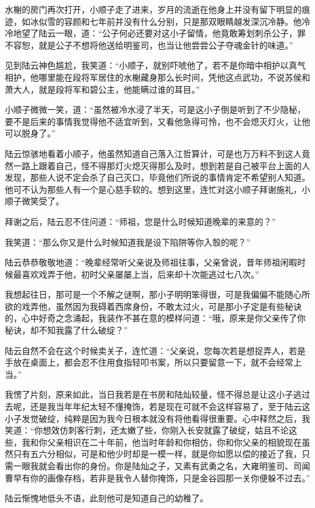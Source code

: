水榭的房门再次打开，小顺子走了进来，岁月的流逝在他身上并没有留下明显的痕迹，如冰似雪的容颜和七年前并没有什么分别，只是那双眼睛越发深沉冷静。他冷冷地望了陆云一眼，道：“公子何必还要对这小子留情，他竟敢筹划刺杀公子，罪不容恕，就是公子不想将他送给明鉴司，也当让他尝尝公子夺魂金针的味道。”

见到陆云神色尴尬，我笑道：“小顺子，就别吓唬他了，若不是你暗中相护以真气相护，他哪里能在段将军居住的水榭藏身那么长时间，凭他这点武功，不说苏侯和萧大人，就是段将军和碧公主，他能瞒过谁的耳目。”

小顺子微微一笑，道：“虽然被冷水浸了半天，可是这小子倒是听到了不少隐秘，要不是后来的事情我觉得他不适宜听到，又看他急得可怜，也不会熄灭灯火，让他可以脱身了。”

陆云惊骇地看着小顺子，他虽然知道自己落入江哲算计，可是也万万料不到这人竟然一路上跟着自己，怪不得那灯火熄灭得那么及时，想到若是自己被平台上面的人发现，那些人说不定会杀了自己灭口，毕竟他们所说的事情肯定不希望别人知道。他可不认为那些人有一个是心慈手软的。想到这里，连忙对这小顺子拜谢施礼，小顺子微笑受了。

拜谢之后，陆云忍不住问道：“师祖，您是什么时候知道晚辈的来意的？”

我笑道：“那么你又是什么时候知道我是设下陷阱等你入彀的呢？”

陆云恭恭敬敬地道：“晚辈经常听父亲说及师祖往事，父亲曾说，昔年师祖闲暇时候最喜欢戏弄于他，初时父亲屡屡上当，后来却十次能逃过七八次。”

我想起往日，那可是一个不解之谜啊，那小子明明笨得很，可是我偏偏不能随心所欲的戏弄他，虽然因为我碍着西席身份，不敢太过火，可是那小子定是有些秘诀的，心中好奇之念涌起，我装作不甚在意的模样问道：“哦，原来是你父亲传了你秘诀，却不知我露了什么破绽？”

陆云自然不会在这个时候卖关子，连忙道：“父亲说，您每次若是想捉弄人，若是手放在桌面上，都会忍不住用食指轻叩书案，所以只要留意一下，就不会经常上当。”

我愣了片刻，原来如此，当日我若是在书房和陆灿较量，怪不得总是让这小子逃过去呢，还是我当年年纪太轻不懂掩饰，若是现在可就不会这样容易了，至于陆云这小子发觉破绽，纯粹是因为我今日根本就没有将他看得很重要。心中释然之后，我笑道：“你想效仿刺客行刺，还太嫩了些，你刚入长安就露了破绽，姑且不论这些，我和你父亲相识在二十年前，他当时年龄和你相仿，你和你父亲的相貌现在虽然只有五六分相似，可是和他少时却是一模一样，就是你如愿以偿的接近了我，只需一眼我就会看出你的身份。你是陆灿之子，又素有武勇之名，大雍明鉴司、司闻曹早有你的画像存档，若非是我令人替你掩饰，只是金谷园那一关你便躲不过去。”

陆云惭愧地低头不语，此刻他可是知道自己的幼稚了。

